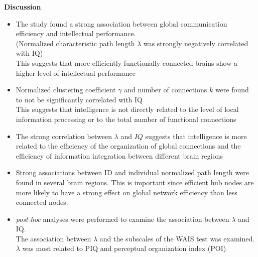 \documentclass[11pt, letterpaper]{article}
\begin{document}
\noindent\textbf{Discussion}
\begin{itemize}
    \setlength\itemsep{0.05em}
    \item {The study found a strong association between global communication efficiency and intellectual performance.\\
           (Normalized characteristic path length $\lambda$ was strongly negatively correlated with IQ) \\
           This suggests that more efficiently functionally connected brains show a higher level of intellectual
           performance}
    \item {Normalized clustering coefficient $\gamma$ and number of connections $k$ were found to not be
           significantly correlated with IQ \\
           This suggests that intelligence is not directly related to the level of local information processing
           or to the total number of functional connections}
    \item {The strong correlation between $\lambda$ and $IQ$ suggests that intelligence is more related to the
           efficiency of the organization of global connections and the efficiency of information integration
           between different brain regions}
    \item {Strong associations between ID and individual normalized path length were found in several brain regions.
           This is important since efficient hub nodes are more likely to have a strong effect on global network 
           efficiency than less connected nodes.}
    \item {\textit{post-hoc} analyses were performed to examine the association between $\lambda$ and IQ. \\
           The association between $\lambda$ and the subscales of the WAIS test was examined. $\lambda$ was most 
           related to PIQ and perceptual organization index (POI)}
\end{itemize}
\end{document}
